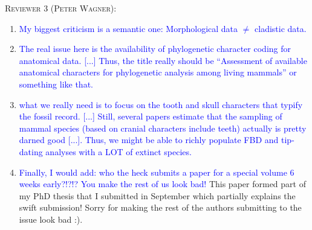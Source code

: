 \documentclass[12pt,letterpaper]{article}
\renewcommand{\section}[1]{%
\bigskip
\begin{center}
\begin{Large}
\normalfont\scshape #1
\medskip
\end{Large}
\end{center}}
\begin{document}
\section{Reviewer 3 (Peter Wagner):}
\begin{enumerate}
\item{\textcolor{blue}{My biggest criticism is a semantic one: Morphological data $\neq$ cladistic data.}}
\item{\textcolor{blue}{The real issue here is the availability of phylogenetic character coding for anatomical data.
[...] Thus, the title really should be ``Assessment of available anatomical characters for phylogenetic analysis among living mammals'' or something like that.}}


\item{\textcolor{blue}{what we really need is to focus on the tooth and skull characters that typify the fossil record.
[...] Still, several papers estimate that the sampling of mammal species (based on cranial characters include teeth) actually is pretty darned good [...].
Thus, we might be able to richly populate FBD and tip-dating analyses with a LOT of extinct species.}}


\item{\textcolor{blue}{Finally, I would add: who the heck submits a paper for a special volume 6 weeks early?!?!? You make the rest of us look bad!}}
This paper formed part of my PhD thesis that I submitted in September which partially explains the swift submission! %
Sorry for making the rest of the authors submitting to the issue look bad :).

\end{enumerate}
\end{document}
